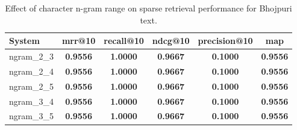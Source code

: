 \begin{table}[ht]
\centering
\caption{Effect of character n-gram range on sparse retrieval performance for Bhojpuri text.}
\label{tab:ablation_ngram}
\begin{tabular}{lccccc}
\toprule
\textbf{System} & \textbf{mrr@10} & \textbf{recall@10} & \textbf{ndcg@10} & \textbf{precision@10} & \textbf{map} \\
\midrule
ngram\_2\_3 & \textbf{0.9556} & \textbf{1.0000} & \textbf{0.9667} & \textbf{0.1000} & \textbf{0.9556} \\
ngram\_2\_4 & \textbf{0.9556} & \textbf{1.0000} & \textbf{0.9667} & \textbf{0.1000} & \textbf{0.9556} \\
ngram\_2\_5 & \textbf{0.9556} & \textbf{1.0000} & \textbf{0.9667} & \textbf{0.1000} & \textbf{0.9556} \\
ngram\_3\_4 & \textbf{0.9556} & \textbf{1.0000} & \textbf{0.9667} & \textbf{0.1000} & \textbf{0.9556} \\
ngram\_3\_5 & \textbf{0.9556} & \textbf{1.0000} & \textbf{0.9667} & \textbf{0.1000} & \textbf{0.9556} \\
\bottomrule
\end{tabular}
\end{table}